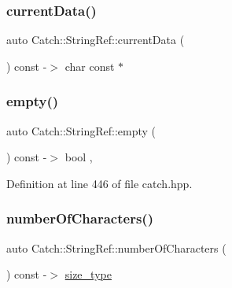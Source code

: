 \mbox{\label{class_catch_1_1_string_ref_aee240387305ca8b249169d79f36e7002}} 
\subsubsection{\texorpdfstring{current\+Data()}{currentData()}}
{\footnotesize\ttfamily auto Catch\+::\+String\+Ref\+::current\+Data (\begin{DoxyParamCaption}{ }\end{DoxyParamCaption}) const -\/$>$  char const $\ast$\hspace{0.3cm}{\ttfamily [noexcept]}}

\mbox{\label{class_catch_1_1_string_ref_ac6b68b9dc1e1dec69e884e3f7be581bd}} 
\subsubsection{\texorpdfstring{empty()}{empty()}}
{\footnotesize\ttfamily auto Catch\+::\+String\+Ref\+::empty (\begin{DoxyParamCaption}{ }\end{DoxyParamCaption}) const -\/$>$ bool \hspace{0.3cm}{\ttfamily [inline]}, {\ttfamily [noexcept]}}



Definition at line 446 of file catch.\+hpp.

\mbox{\label{class_catch_1_1_string_ref_a6a6cac7430e626ffdd7550a081e8168f}} 
\subsubsection{\texorpdfstring{number\+Of\+Characters()}{numberOfCharacters()}}
{\footnotesize\ttfamily auto Catch\+::\+String\+Ref\+::number\+Of\+Characters (\begin{DoxyParamCaption}{ }\end{DoxyParamCaption}) const -\/$>$  \mbox{\hyperlink{class_catch_1_1_string_ref_a06b4db8fc82b197004291cf370b2ba7c}{size\+\_\+type}}\hspace{0.3cm}{\ttfamily [noexcept]}}

